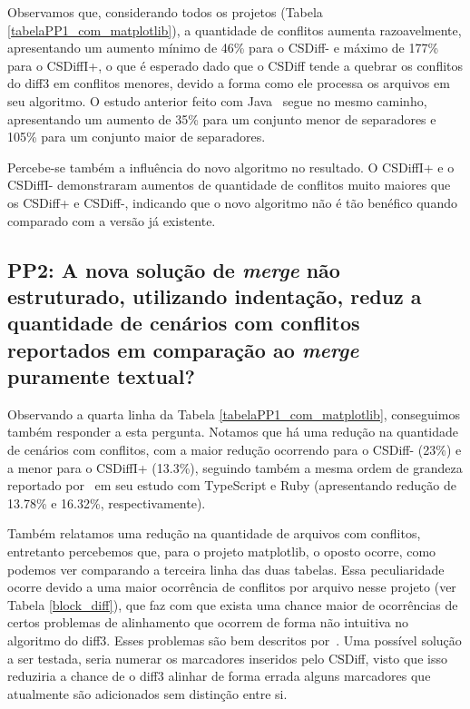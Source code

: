 Observamos que, considerando todos os projetos (Tabela \ref{tabelaPP1_com_matplotlib}), a quantidade de conflitos aumenta
razoavelmente, apresentando um aumento mínimo de 46\% para o CSDiff- e máximo de 177\% para o CSDiffI+, o que é esperado dado que o
CSDiff tende a quebrar os conflitos do diff3 em conflitos menores, devido a forma como ele processa os arquivos em seu algoritmo.
O estudo anterior feito com Java~\cite{clem21} segue no mesmo caminho, apresentando um aumento de 35\% para um conjunto menor de
separadores e 105\% para um conjunto maior de separadores.

Percebe-se também a influência do novo algoritmo no resultado. O CSDiffI+ e o CSDiffI- demonstraram aumentos de quantidade de
conflitos muito maiores que os CSDiff+ e CSDiff-, indicando que o novo algoritmo não é tão benéfico quando comparado com a
versão já existente.

\subsection{PP2: A nova solução de \emph{merge} não estruturado, utilizando indentação,
	reduz a quantidade de cenários com conflitos reportados em comparação ao \emph{merge} puramente textual?}\label{resultado_pp2}
Observando a quarta linha da Tabela \ref{tabelaPP1_com_matplotlib}, conseguimos também responder a esta pergunta. Notamos
que há uma redução na quantidade de cenários com conflitos, com a maior redução ocorrendo para o CSDiff- (23\%) e a menor para o
CSDiffI+ (13.3\%), seguindo também a mesma ordem de grandeza reportado por~\citeauthor{heitor21} em seu estudo com TypeScript
e Ruby (apresentando redução de 13.78\% e 16.32\%, respectivamente).

Também relatamos uma redução na quantidade de arquivos com conflitos, entretanto percebemos que,
para o projeto matplotlib, o oposto ocorre, como podemos ver comparando a terceira linha das duas tabelas. Essa peculiaridade
ocorre devido a uma maior ocorrência de conflitos por arquivo nesse projeto (ver Tabela \ref{block_diff}), que faz com que
exista uma chance maior de ocorrências de certos problemas de alinhamento que ocorrem de forma não intuitiva no algoritmo do
diff3. Esses problemas são bem descritos por~\cite{khan07}. Uma possível solução a ser testada, seria numerar os marcadores
inseridos pelo CSDiff, visto que isso reduziria a chance de o diff3 alinhar de forma errada alguns marcadores que atualmente
são adicionados sem distinção entre si.

